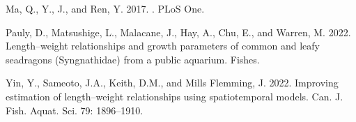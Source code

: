 \documentclass[12pt]{article}\usepackage[]{graphicx}\usepackage[]{color}
\begin{document}
\begin{CSLReferences}{1}{0}
Ma, Q., Y., J., and Ren, Y. 2017. . PLoS One.

Pauly, D., Matsushige, L., Malacane, J., Hay, A., Chu, E., and Warren, M. 2022. Length--weight relationships and growth parameters of common and leafy seadragons ({S}yngnathidae) from a public aquarium. Fishes.

Yin, Y., Sameoto, J.A., Keith, D.M., and Mills Flemming, J. 2022. Improving estimation of length--weight relationships using spatiotemporal models. Can. J. Fish. Aquat. Sci. 79: 1896--1910.

\end{CSLReferences}
\end{document}
